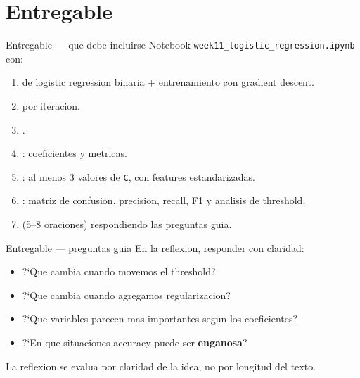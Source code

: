 \section[Entregable]{Entregable\label{sec:entregable-w11}}

\begin{frame}{Entregable — que debe incluirse}
Notebook \texttt{week11\_logistic\_regression.ipynb} con:
\begin{enumerate}\small
  \item {} de logistic regression binaria + entrenamiento con gradient descent.
  \item {} por iteracion.
  \item {}.
  \item {}: coeficientes y metricas.
  \item {}: al menos 3 valores de \texttt{C}, con features estandarizadas.
  \item {}: matriz de confusion, precision, recall, F1 y analisis de threshold.
  \item {} (5--8 oraciones) respondiendo las preguntas guia.
\end{enumerate}
\end{frame}

\begin{frame}{Entregable — preguntas guia}
En la reflexion, responder con claridad:
\begin{itemize}\small
  \item ?`Que cambia cuando movemos el threshold?
  \item ?`Que cambia cuando agregamos regularizacion?
  \item ?`Que variables parecen mas importantes segun los coeficientes?
  \item ?`En que situaciones accuracy puede ser \textbf{enganosa}?
\end{itemize}

\vspace{0.3em}
{\footnotesize La reflexion se evalua por claridad de la idea, no por longitud del texto.}
\end{frame}

